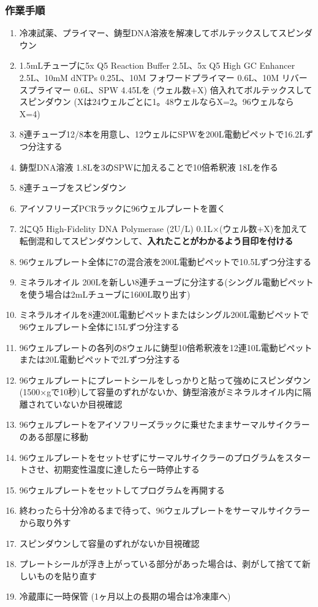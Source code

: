 \documentclass[titlepage,10pt,a4paper,uplatex]{jsbook}
\renewcommand{\textbf}[1]{{\bfseries\sffamily#1}}
\begin{document}
\subsubsection{作業手順}
\begin{enumerate}
\item 冷凍試薬、プライマー、鋳型DNA溶液を解凍してボルテックスしてスピンダウン
\item 1.5mLチューブに5x Q5 Reaction Buffer 2.5{\textmu}L、5x Q5 High GC Enhancer 2.5{\textmu}L、10mM dNTPs 0.25{\textmu}L、10{\textmu}M フォワードプライマー 0.6{\textmu}L、10{\textmu}M リバースプライマー 0.6{\textmu}L、SPW 4.45{\textmu}Lを (ウェル数+X) 倍入れてボルテックスしてスピンダウン (Xは24ウェルごとに1。48ウェルならX=2。96ウェルならX=4)
\item 8連チューブ12/8本を用意し、12ウェルにSPWを200{\textmu}L電動ピペットで16.2{\textmu}Lずつ分注する
\item 鋳型DNA溶液 1.8{\textmu}Lを3のSPWに加えることで10倍希釈液 18{\textmu}Lを作る
\item 8連チューブをスピンダウン
\item アイソフリーズPCRラックに96ウェルプレートを置く
\item 2にQ5 High-Fidelity DNA Polymerase (2U/{\textmu}L) 0.1{\textmu}L×(ウェル数+X)を加えて転倒混和してスピンダウンして、\textbf{入れたことがわかるよう目印を付ける}
\item 96ウェルプレート全体に7の混合液を200{\textmu}L電動ピペットで10.5{\textmu}Lずつ分注する
\item ミネラルオイル 200{\textmu}Lを新しい8連チューブに分注する(シングル電動ピペットを使う場合は2mLチューブに1600{\textmu}L取り出す)
\item ミネラルオイルを8連200{\textmu}L電動ピペットまたはシングル200{\textmu}L電動ピペットで96ウェルプレート全体に15{\textmu}Lずつ分注する
\item 96ウェルプレートの各列の8ウェルに鋳型10倍希釈液を12連10{\textmu}L電動ピペットまたは20{\textmu}L電動ピペットで2{\textmu}Lずつ分注する
\item 96ウェルプレートにプレートシールをしっかりと貼って強めにスピンダウン(1500×gで10秒)して容量のずれがないか、鋳型溶液がミネラルオイル内に隔離されていないか目視確認
\item 96ウェルプレートをアイソフリーズラックに乗せたままサーマルサイクラーのある部屋に移動
\item 96ウェルプレートをセットせずにサーマルサイクラーのプログラムをスタートさせ、初期変性温度に達したら一時停止する
\item 96ウェルプレートをセットしてプログラムを再開する
\item 終わったら十分冷めるまで待って、96ウェルプレートをサーマルサイクラーから取り外す
\item スピンダウンして容量のずれがないか目視確認
\item プレートシールが浮き上がっている部分があった場合は、剥がして捨てて新しいものを貼り直す
\item 冷蔵庫に一時保管 (1ヶ月以上の長期の場合は冷凍庫へ)
\end{enumerate}
\end{document}
